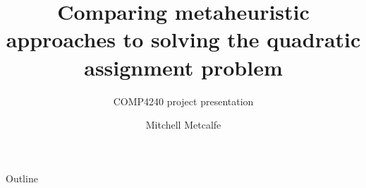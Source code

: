 



\title{Comparing metaheuristic approaches to solving the quadratic assignment problem}
\subtitle{COMP4240 project presentation}
\author{Mitchell Metcalfe}





\maketitle

\begin{frame}{Outline}
    \tableofcontents
\end{frame}

